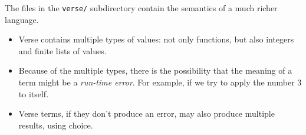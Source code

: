 \documentclass{article}
\theoremstyle{definition}
\begin{document}
The files in the  \texttt{verse/} subdirectory contain the semantics of a much richer language.

\begin{itemize}
\item Verse contains multiple types of values: not only functions, but also integers and finite lists of values.
\item Because of the multiple types, there is the possibility
that the meaning of a term might be a \emph{run-time error}. For
example, if we try to apply the number 3 to itself.
\item Verse terms, if they don't produce an error, may also 
  produce multiple results, using choice.
\end{itemize}
\end{document}
